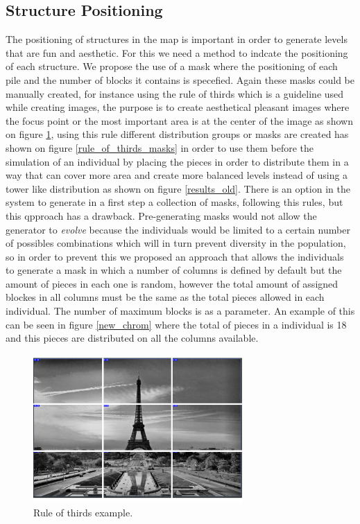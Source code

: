 \documentclass[conference]{IEEEtran}
\begin{document}
    \subsection{Structure Positioning}

     The positioning of structures in the map is important in order to generate
     levels that are fun and aesthetic. For this we need a method to indcate the
     positioning of each structure. We propose the use of a mask where the
     positioning of each pile and the number of blocks it contains is specefied.
     Again these masks could be manually created, for instance using the rule of
     thirds \cite{DarrenRowse} which is a guideline used while creating images,
     the purpose is to create aesthetical pleasant images where the focus point
     or the most important area is at the center of the image as shown on figure
     \ref{rule_of_thirds}, using this rule different distribution groups or
     masks are created has shown on figure \ref{rule_of_thirds_masks} in order
     to use them before the simulation of an individual by placing the pieces in
     order to distribute them in a way that can cover more area and create more
     balanced levels instead of using a tower like distribution as shown on
     figure \ref{results_old}. There is an option in the system to generate in a
     first step a collection of masks, following this rules, but this qpproach
     has a drawback. Pre-generating masks would not allow the generator to
     \textit{evolve} because the individuals would be limited to a certain
     number of possibles combinations which will in turn prevent diversity in
     the population, so in order to prevent this we proposed an approach that
     allows the individuals to generate a mask in which a number of columns is
     defined by default but the amount of pieces in each one is random, however
     the total amount of assigned blockes in all columns must be the same as the
     total pieces allowed in each individual. The number of maximum blocks is as
     a parameter. An example of this can be seen in figure \ref{new_chrom} where
     the total of pieces in a individual is 18 and this pieces are distributed
     on all the columns available.
     
    
    \begin{figure}[htbp]
        \centerline{\includegraphics[width=80mm]{Images/ruleofthirds_example.png}}
        \caption{Rule of thirds example.}
        \label{rule_of_thirds}
    \end{figure}
    
\end{document}
